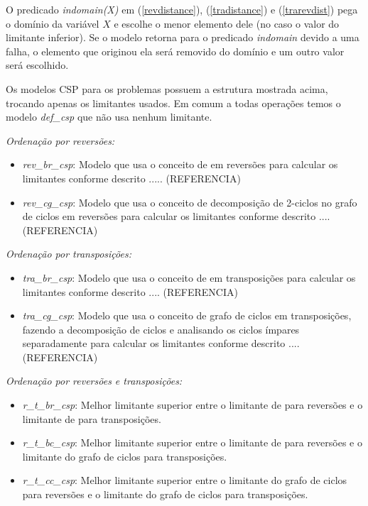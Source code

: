 O predicado \textit{indomain(X)} em (\ref{revdistance}),
(\ref{tradistance}) e (\ref{trarevdist}) pega o domínio da variável
$X$ e escolhe o menor elemento dele (no caso o valor do limitante
inferior). Se o modelo retorna para o predicado \textit{indomain}
devido a uma falha, o elemento que originou ela será removido do
domínio e um outro valor será escolhido.

Os modelos CSP para os problemas possuem a estrutura mostrada acima,
trocando apenas os limitantes usados. Em comum a todas operações temos
o modelo \textit{def\_csp} que não usa nenhum limitante.

\textit{Ordenação por reversões:}
\begin{itemize}
\item{\textit{rev\_br\_csp}: 
Modelo que usa o conceito de \bkp{} em reversões para calcular os
limitantes conforme descrito ..... (REFERENCIA)}
\item{\textit{rev\_cg\_csp}:
Modelo que usa o conceito de decomposição de 2-ciclos no grafo de
ciclos em reversões para calcular os limitantes conforme descrito
.... (REFERENCIA)}
\end{itemize}

\textit{Ordenação por transposições:}
\begin{itemize}
\item{\textit{tra\_br\_csp}: 
Modelo que usa o conceito de \bkp{} em transposições para calcular os
limitantes conforme descrito .... (REFERENCIA)}
\item{\textit{tra\_cg\_csp}:
Modelo que usa o conceito de grafo de ciclos em transposições, fazendo
a decomposição de ciclos e analisando os ciclos ímpares separadamente
para calcular os limitantes conforme descrito .... (REFERENCIA)}
\end{itemize}

\textit{Ordenação por reversões e transposições:} 
\begin{itemize}
\item{\textit{r\_t\_br\_csp}: 
Melhor limitante superior entre o limitante de \bkp{} para reversões e
o limitante de \bkp{} para transposições.}
\item{\textit{r\_t\_bc\_csp}:
Melhor limitante superior entre o limitante de \bkp{} para reversões e
o limitante do grafo de ciclos para transposições.}
\item{\textit{r\_t\_cc\_csp}: 
Melhor limitante superior entre o limitante do grafo de ciclos para
reversões e o limitante do grafo de ciclos para transposições.}
\end{itemize}

